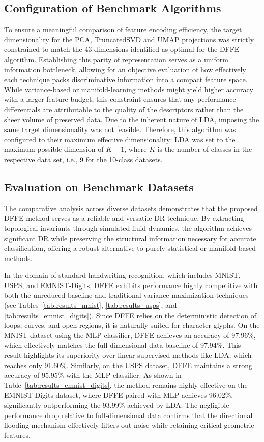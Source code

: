 \documentclass[a4paper,fleqn]{cas-dc}
\begin{document}
\subsection{Configuration of Benchmark Algorithms}

To ensure a meaningful comparison of feature encoding efficiency, the target dimensionality for the PCA, TruncatedSVD and UMAP projections was strictly constrained to match the 43 dimensions identified as optimal for the DFFE algorithm. Establishing this parity of representation serves as a uniform information bottleneck, allowing for an objective evaluation of how effectively each technique packs discriminative information into a compact feature space. While variance-based or manifold-learning methods might yield higher accuracy with a larger feature budget, this constraint ensures that any performance differentials are attributable to the quality of the descriptors rather than the sheer volume of preserved data.
Due to the inherent nature of LDA, imposing the same target dimensionality was not feasible. Therefore, this algorithm was configured to their maximum effective dimensionality: LDA was set to the maximum possible dimension of $K-1$, where $K$ is the number of classes in the respective data set, i.e., 9 for the 10-class datasets.


\subsection{Evaluation on Benchmark Datasets}

The comparative analysis across diverse datasets demonstrates that the proposed DFFE method serves as a reliable and versatile DR technique. By extracting topological invariants through simulated fluid dynamics, the algorithm achieves significant DR while preserving the structural information necessary for accurate classification, offering a robust alternative to purely statistical or manifold-based methods.

In the domain of standard handwriting recognition, which includes MNIST, USPS, and EMNIST-Digits, DFFE exhibits performance highly competitive with both the unreduced baseline and traditional variance-maximization techniques (see Tables~\ref{tab:results_mnist}, \ref{tab:results_usps}, and \ref{tab:results_emnist_digits}). Since DFFE relies on the deterministic detection of loops, curves, and open regions, it is naturally suited for character glyphs. On the MNIST dataset using the MLP classifier, DFFE achieves an accuracy of 97.96\%, which effectively matches the full-dimensional data baseline of 97.94\%. This result highlights its superiority over linear supervised methods like LDA, which reaches only 91.60\%. Similarly, on the USPS dataset, DFFE maintains a strong accuracy of 95.95\% with the MLP classifier. As shown in Table~\ref{tab:results_emnist_digits}, the method remains highly effective on the EMNIST-Digits dataset, where DFFE paired with MLP achieves 96.02\%, significantly outperforming the 93.99\% achieved by LDA. The negligible performance drop relative to full-dimensional data confirms that the directional flooding mechanism effectively filters out noise while retaining critical geometric features.
\end{document}
